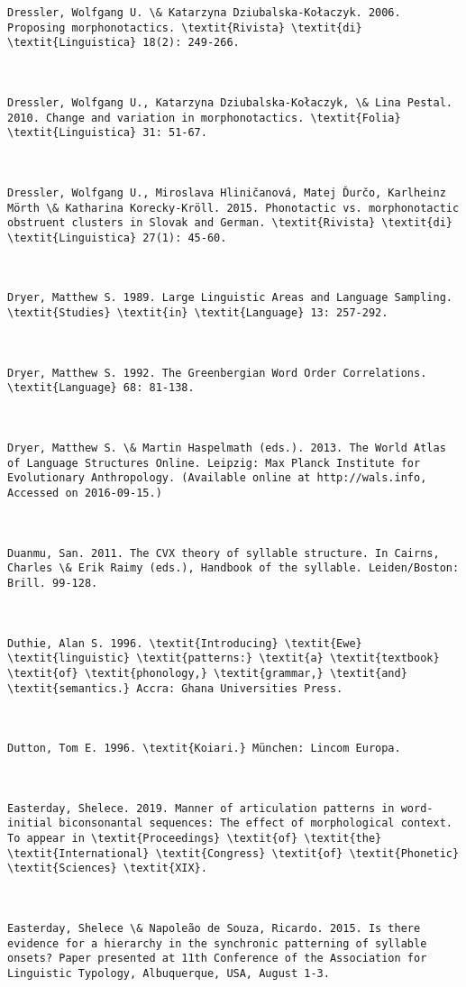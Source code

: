 \begin{verbatim}
Dressler, Wolfgang U. \& Katarzyna Dziubalska-Kołaczyk. 2006. Proposing morphonotactics. \textit{Rivista} \textit{di} \textit{Linguistica} 18(2): 249-266.



Dressler, Wolfgang U., Katarzyna Dziubalska-Kołaczyk, \& Lina Pestal. 2010. Change and variation in morphonotactics. \textit{Folia} \textit{Linguistica} 31: 51-67.



Dressler, Wolfgang U., Miroslava Hliničanová, Matej Ďurčo, Karlheinz Mörth \& Katharina Korecky-Kröll. 2015. Phonotactic vs. morphonotactic obstruent clusters in Slovak and German. \textit{Rivista} \textit{di} \textit{Linguistica} 27(1): 45-60.



Dryer, Matthew S. 1989. Large Linguistic Areas and Language Sampling. \textit{Studies} \textit{in} \textit{Language} 13: 257-292.



Dryer, Matthew S. 1992. The Greenbergian Word Order Correlations. \textit{Language} 68: 81-138.



Dryer, Matthew S. \& Martin Haspelmath (eds.). 2013. The World Atlas of Language Structures Online. Leipzig: Max Planck Institute for Evolutionary Anthropology. (Available online at http://wals.info, Accessed on 2016-09-15.)



Duanmu, San. 2011. The CVX theory of syllable structure. In Cairns, Charles \& Erik Raimy (eds.), Handbook of the syllable. Leiden/Boston: Brill. 99-128.



Duthie, Alan S. 1996. \textit{Introducing} \textit{Ewe} \textit{linguistic} \textit{patterns:} \textit{a} \textit{textbook} \textit{of} \textit{phonology,} \textit{grammar,} \textit{and} \textit{semantics.} Accra: Ghana Universities Press.



Dutton, Tom E. 1996. \textit{Koiari.} München: Lincom Europa.



Easterday, Shelece. 2019. Manner of articulation patterns in word-initial biconsonantal sequences: The effect of morphological context. To appear in \textit{Proceedings} \textit{of} \textit{the} \textit{International} \textit{Congress} \textit{of} \textit{Phonetic} \textit{Sciences} \textit{XIX}.



Easterday, Shelece \& Napoleão de Souza, Ricardo. 2015. Is there evidence for a hierarchy in the synchronic patterning of syllable onsets? Paper presented at 11th Conference of the Association for Linguistic Typology, Albuquerque, USA, August 1-3.




\end{verbatim}
